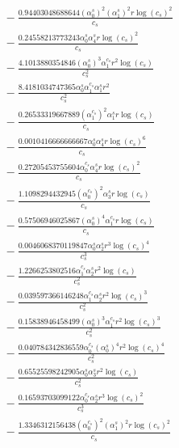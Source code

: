 \documentclass[10pt]{article}
\begin{document}
\begin{align*}
&{}  - \frac{0.94403048688644 \left(\alpha_{0}^s\right)^{2} \left(\alpha_{1}^s\right)^{2} r \log{\left(c_{s} \right)}^{2}}{c_{s}} \\
&{}  - \frac{0.24558213773243 \alpha_{0}^s \alpha_{4}^s r \log{\left(c_{s} \right)}^{2}}{c_{s}} \\
&{}  - \frac{4.1013880354846 \left(\alpha_{0}^s\right)^{3} \alpha_{1}^{c_s} r^{2} \log{\left(c_{s} \right)}}{c_{s}^{2}} \\
&{}  - \frac{8.4181034747365 \alpha_{0}^s \alpha_{1}^{c_s} \alpha_{1}^s r^{2}}{c_{s}^{2}} \\
&{}  - \frac{0.26533319667889 \left(\alpha_{1}^{c_s}\right)^{2} \alpha_{1}^s r \log{\left(c_{s} \right)}}{c_{s}} \\
&{}  - \frac{0.0010416666666667 \alpha_{0}^s \alpha_{4}^s r \log{\left(c_{s} \right)}^{6}}{c_{s}} \\
&{}  - \frac{0.27205453755604 \alpha_{0}^{c_s} \alpha_{4}^s r \log{\left(c_{s} \right)}^{2}}{c_{s}} \\
&{}  - \frac{1.1098294432945 \left(\alpha_{0}^{c_s}\right)^{2} \alpha_{3}^s r \log{\left(c_{s} \right)}}{c_{s}} \\
&{}  - \frac{0.57506946025867 \left(\alpha_{0}^s\right)^{4} \alpha_{1}^{c_s} r \log{\left(c_{s} \right)}}{c_{s}} \\
&{}  - \frac{0.0046068370119847 \alpha_{0}^s \alpha_{2}^s r^{3} \log{\left(c_{s} \right)}^{4}}{c_{s}^{3}} \\
&{}  - \frac{1.2266253802516 \alpha_{1}^{c_s} \alpha_{2}^s r^{2} \log{\left(c_{s} \right)}}{c_{s}^{2}} \\
&{}  - \frac{0.039597366146248 \alpha_{1}^{c_s} \alpha_{2}^s r^{2} \log{\left(c_{s} \right)}^{3}}{c_{s}^{2}} \\
&{}  - \frac{0.15838946458499 \left(\alpha_{0}^s\right)^{3} \alpha_{1}^{c_s} r^{2} \log{\left(c_{s} \right)}^{3}}{c_{s}^{2}} \\
&{}  - \frac{0.040784342836559 \alpha_{0}^{c_s} \left(\alpha_{0}^s\right)^{4} r^{2} \log{\left(c_{s} \right)}^{4}}{c_{s}^{2}} \\
&{}  - \frac{0.65525598242905 \alpha_{0}^s \alpha_{3}^s r^{2} \log{\left(c_{s} \right)}}{c_{s}^{2}} \\
&{}  - \frac{0.16593703099122 \alpha_{0}^{c_s} \alpha_{2}^s r^{3} \log{\left(c_{s} \right)}^{2}}{c_{s}^{3}} \\
&{}  - \frac{1.3346312156438 \left(\alpha_{0}^{c_s}\right)^{2} \left(\alpha_{1}^s\right)^{2} r \log{\left(c_{s} \right)}^{2}}{c_{s}} \\

\end{align*}
\end{document}
